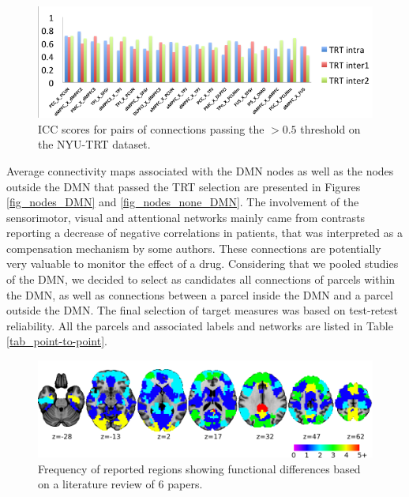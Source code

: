 \begin{figure}[H]
\begin{center}
\includegraphics[width=\linewidth]{../figures/fig_icc.png}
\end{center}
\caption[ICC scores]{
  ICC scores for pairs of connections passing the $>0.5$ threshold on the NYU-TRT dataset.
}
\label{fig_icc}
\end{figure}

Average connectivity maps associated with the DMN nodes as well as the nodes outside the DMN that passed the TRT selection are presented in Figures \ref{fig_nodes_DMN} and \ref{fig_nodes_none_DMN}. The involvement of the sensorimotor, visual and attentional networks mainly came from contrasts reporting a decrease of negative correlations in patients, that was interpreted as a compensation mechanism by some authors. These connections are potentially very valuable to monitor the effect of a drug. Considering that we pooled studies of the DMN, we decided to select as candidates all connections of parcels within the DMN, as well as connections between a parcel inside the DMN and a parcel outside the DMN. The final selection of target measures was based on test-retest reliability. All the parcels and associated labels and networks are listed in Table \ref{tab_point-to-point}.


\begin{figure}[H]
\begin{center}
\includegraphics[width=\linewidth]{../figures/fig_freq_sel_dat.png}
\end{center}
\caption[Cited region frequency]{
  Frequency of reported regions showing functional differences based on a literature review of 6 papers.
}
\label{fig_freq_sel}
\end{figure}

